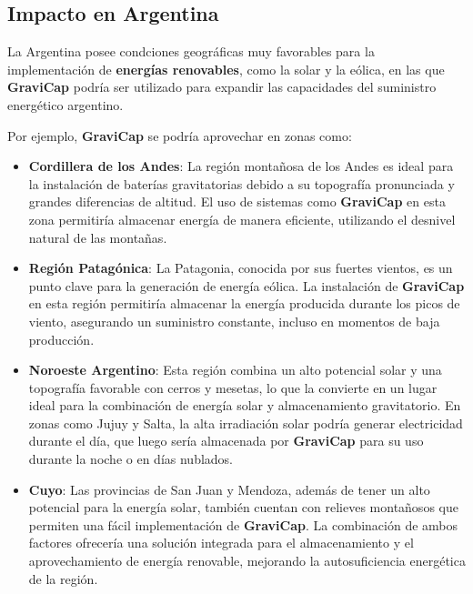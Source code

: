             \subsection{Impacto en Argentina}
                La Argentina posee condciones geográficas muy favorables para la implementación de \textbf{energías renovables}, como la solar y la eólica, en las que \textcolor{dark_violet}{\textbf{GraviCap}} podría ser utilizado para expandir las capacidades del suministro energético argentino.\par
                Por ejemplo, \textcolor{dark_violet}{\textbf{GraviCap}} se podría aprovechar  en zonas como:\par
                \begin{itemize} [label=•]
                    \setlength{\itemindent}{1.5em}
                    
                    \item \textbf{Cordillera de los Andes}: La región montañosa de los Andes es ideal para la instalación de baterías gravitatorias debido a su topografía pronunciada y grandes diferencias de altitud. El uso de sistemas como \textcolor{dark_violet}{\textbf{GraviCap}} en esta zona permitiría almacenar energía de manera eficiente, utilizando el desnivel natural de las montañas.\par
                    \item \textbf{Región Patagónica}: La Patagonia, conocida por sus fuertes vientos, es un punto clave para la generación de energía eólica. La instalación de \textcolor{dark_violet}{\textbf{GraviCap}} en esta región permitiría almacenar la energía producida durante los picos de viento, asegurando un suministro constante, incluso en momentos de baja producción.\par
                    \item \textbf{Noroeste Argentino}: Esta región combina un alto potencial solar y una topografía favorable con cerros y mesetas, lo que la convierte en un lugar ideal para la combinación de energía solar y almacenamiento gravitatorio. En zonas como Jujuy y Salta, la alta irradiación solar podría generar electricidad durante el día, que luego sería almacenada por \textcolor{dark_violet}{\textbf{GraviCap}} para su uso durante la noche o en días nublados.\par
                    \item \textbf{Cuyo}: Las provincias de San Juan y Mendoza, además de tener un alto potencial para la energía solar, también cuentan con relieves montañosos que permiten una fácil implementación de \textcolor{dark_violet}{\textbf{GraviCap}}. La combinación de ambos factores ofrecería una solución integrada para el almacenamiento y el aprovechamiento de energía renovable, mejorando la autosuficiencia energética de la región.\par
                \end{itemize}

